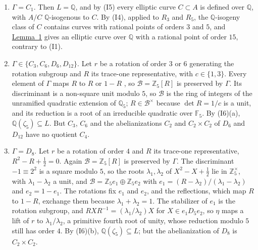 \documentclass[11pt]{article}
\newcommand{\Q}{\mathbb Q}
\newcommand{\Z}{\mathbb Z}
\newcommand{\F}{\mathbb F}
\begin{document}
\begin{enumerate}
\item[(i)] \(\Gamma=C_1\). Then \(L=\Q\), and by (I5) every elliptic curve \(C\subset A\) is defined
over \(\Q\), with \(A/C\) \(\Q\)-isogenous to \(C\). By (I4), applied to \(R_3\) and \(R_5\), the
\(\Q\)-isogeny class of \(C\) contains curves with rational points of orders \(3\) and \(5\), and
\hyperref[lemma-coprime]{Lemma~1} gives an elliptic curve over \(\Q\) with a rational point of order
\(15\), contrary to (I1).

\item[(ii)] \(\Gamma\in\{C_3,C_6,D_6,D_{12}\}\). Let \(r\) be a rotation of order \(3\) or \(6\)
generating the rotation subgroup and \(R\) its trace-one representative, with \(c\in\{1,3\}\). Every
element of \(\Gamma\) maps \(R\) to \(R\) or \(1-R\) \cite[Section~7]{P63}, so
\(\mathcal B=\Z_5[R]\) is preserved by \(\Gamma\). Its discriminant is a non-square unit modulo \(5\),
so \(\mathcal B\) is the ring of integers of the unramified quadratic extension of \(\Q_5\);
\(R\in\mathcal B^\times\) because \(\det R=1/c\) is a unit, and its reduction is a root of an
irreducible quadratic over \(\F_5\). By (I6)(a), \(\Q(\zeta_5)\subseteq L\). But \(C_3\), \(C_6\) and
the abelianizations \(C_2\) and \(C_2\times C_2\) of \(D_6\) and \(D_{12}\) have no quotient \(C_4\).

\item[(iii)] \(\Gamma=D_8\). Let \(r\) be a rotation of order \(4\) and \(R\) its trace-one
representative, \(R^2-R+\tfrac12=0\). Again \(\mathcal B=\Z_5[R]\) is preserved by \(\Gamma\). The
discriminant \(-1\equiv2^2\) is a square modulo \(5\), so the roots \(\lambda_1,\lambda_2\) of
\(X^2-X+\tfrac12\) lie in \(\Z_5^\times\), with \(\lambda_1-\lambda_2\) a unit, and
\(\mathcal B=\Z_5e_1\oplus\Z_5e_2\) with \(e_1=(R-\lambda_2)/(\lambda_1-\lambda_2)\) and
\(e_2=1-e_1\). The rotations fix \(e_1\) and \(e_2\), and the reflections, which map \(R\) to
\(1-R\), exchange them because \(\lambda_1+\lambda_2=1\). The stabilizer of \(e_1\) is the rotation
subgroup, and \(RXR^{-1}=(\lambda_1/\lambda_2)X\) for \(X\in e_1D_5e_2\), so \(\eta\) maps a lift of
\(r\) to \(\lambda_1/\lambda_2\), a primitive fourth root of unity, whose reduction modulo \(5\) still
has order \(4\). By (I6)(b), \(\Q(\zeta_5)\subseteq L\); but the abelianization of \(D_8\) is
\(C_2\times C_2\).


\end{enumerate}
\end{document}
